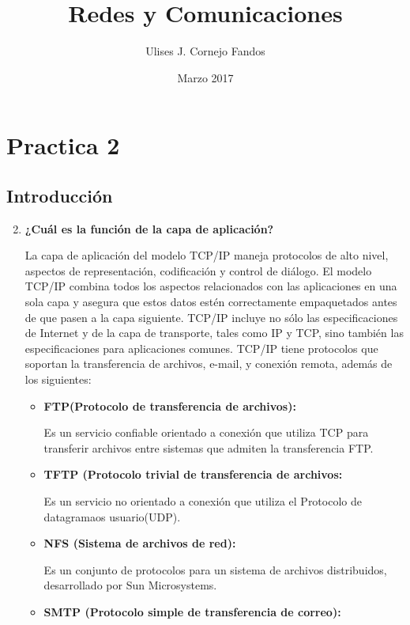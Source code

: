 \documentclass[a4paper,10pt]{article}
\title{Redes y Comunicaciones}
\author{Ulises J. Cornejo Fandos}
\date{Marzo 2017}
\begin{document}
\maketitle

\section{Practica 2}
\subsection{Introducción}
\begin{enumerate}
    \setcounter{enumi}{1}
    \item \textbf{¿Cuál es la función de la capa de aplicación?}

    La capa de aplicación del modelo TCP/IP maneja protocolos de alto nivel, aspectos de representación, codificación y control de diálogo. El modelo TCP/IP combina todos los aspectos relacionados con las aplicaciones en una sola capa y asegura que estos datos estén correctamente empaquetados antes de que pasen a la capa siguiente. TCP/IP incluye no sólo las especificaciones de Internet y de la capa de transporte, tales como IP y TCP, sino también las especificaciones para aplicaciones comunes. TCP/IP tiene protocolos que soportan la transferencia de archivos, e-mail, y conexión remota, además de los siguientes:
        \begin{itemize}
            \item \textbf{FTP(Protocolo de transferencia de archivos):}

            Es un servicio confiable orientado a conexión que utiliza TCP para transferir archivos entre sistemas que admiten la transferencia FTP.

            \item \textbf{TFTP (Protocolo trivial de transferencia de archivos:}

            Es un servicio no orientado a conexión que utiliza el Protocolo de datagramaos   usuario(UDP).

            \item \textbf{NFS (Sistema de archivos de red):}

            Es un conjunto de protocolos para un sistema de archivos distribuidos, desarrollado por Sun Microsystems.

            \item \textbf{SMTP (Protocolo simple de transferencia de correo):}


\end{itemize}
\end{enumerate}
\end{document}
